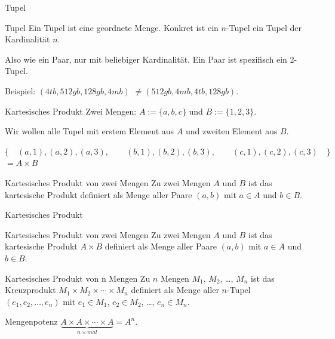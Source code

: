 \documentclass{beamer}
\begin{document}
\begin{frame}{Tupel}
	 
	\begin{block}{Tupel}
		Ein Tupel ist eine geordnete Menge.   Konkret ist ein $n$-Tupel ein Tupel der Kardinalität $n$.
	\end{block}
	 
	Also wie ein Paar, nur mit beliebiger Kardinalität.   Ein Paar ist spezifisch ein 2-Tupel. 
	
	Beispiel: $(4tb, 512gb, 128gb, 4mb)$   $\neq (512gb, 4mb, 4tb, 128gb)$.
\end{frame}

\begin{frame}{Kartesisches Produkt}
	Zwei Mengen: $A := \{a, b, c\}$   und $B := \{1, 2, 3\}$.  
	
	Wir wollen alle Tupel   mit erstem Element aus $A$   und zweiten Element aus $B$. 
	
	$\{
	\quad (a, 1), (a, 2), (a, 3), 
	\qquad (b, 1), (b, 2), (b, 3), 
	\qquad (c, 1), (c, 2), (c, 3)\quad
	\}$   $ = A \times B$
	
	 
	
	\begin{block}{Kartesisches Produkt von zwei Mengen}
		Zu zwei Mengen $A$ und $B$ ist das kartesische Produkt definiert als Menge aller Paare $(a, b)$ mit $a \in A$ und $b \in B$.
	\end{block}
\end{frame}

\begin{frame}{Kartesisches Produkt}
	\begin{block}{Kartesisches Produkt von zwei Mengen}
	Zu zwei Mengen $A$ und $B$ ist das kartesische Produkt $A \times B$ definiert als Menge aller Paare $(a, b)$ mit $a \in A$ und $b \in B$.
	\end{block}
	
	\begin{block}{Kartesisches Produkt von n Mengen}
		Zu $n$ Mengen $M_1$, $M_2$, \dots, $M_n$   ist das Kreuzprodukt $M_1 \times M_2 \times \cdots \times M_n$   definiert als Menge aller $n$-Tupel $(e_1, e_2, \dots, e_n)$   mit $e_1 \in M_1$, $e_2 \in M_2$, \dots, $e_n \in M_n$.
	\end{block} 
	
	\begin{block}{Mengenpotenz}
		$\underbrace{A \times A \times \cdots \times A}_{n \times mal} = A^n$.
	\end{block}
\end{frame}
\end{document}
